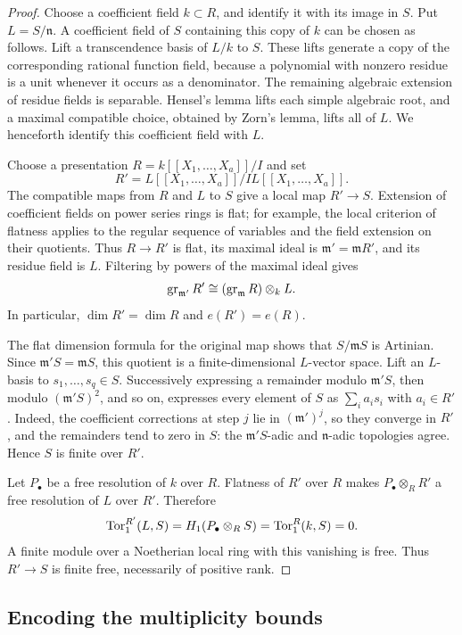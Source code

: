 \begin{proof}
Choose a coefficient field $k\subset R$, and identify it with its image
in $S$.  Put $L=S/\mathfrak n$.  A coefficient field of $S$ containing
this copy of $k$ can be chosen as follows.  Lift a transcendence basis
of $L/k$ to $S$.  These lifts generate a copy of the corresponding
rational function field, because a polynomial with nonzero residue is
a unit whenever it occurs as a denominator.  The remaining algebraic
extension of residue fields is separable.  Hensel's lemma lifts each
simple algebraic root, and a maximal compatible choice, obtained by
Zorn's lemma, lifts all of $L$.  We henceforth identify this coefficient
field with $L$.

Choose a presentation $R=k[[X_1,\ldots,X_a]]/I$ and set
\[
 R'=L[[X_1,\ldots,X_a]]/I L[[X_1,\ldots,X_a]].
\]
The compatible maps from $R$ and $L$ to $S$ give a local map $R'\to S$.
Extension of coefficient fields on power series rings is flat; for
example, the local criterion of flatness applies to the regular
sequence of variables and the field extension on their quotients.
Thus $R\to R'$ is flat, its maximal ideal is $\mathfrak m'=\mathfrak mR'$,
and its residue field is $L$.  Filtering by powers of the maximal
ideal gives
\[
 \operatorname{gr}_{\mathfrak m'}R'
   \cong (\operatorname{gr}_{\mathfrak m}R)\otimes_k L.
\]
In particular, $\dim R'=\dim R$ and $e(R')=e(R)$.

The flat dimension formula for the original map shows that
$S/\mathfrak mS$ is Artinian.  Since
$\mathfrak m'S=\mathfrak mS$, this quotient is a finite-dimensional
$L$-vector space.  Lift an $L$-basis to $s_1,\ldots,s_q\in S$.
Successively expressing a remainder modulo $\mathfrak m'S$, then
modulo $(\mathfrak m'S)^2$, and so on, expresses every element of $S$
as $\sum_i a_i s_i$ with $a_i\in R'$.  Indeed, the coefficient
corrections at step $j$ lie in $(\mathfrak m')^j$, so they converge in
$R'$, and the remainders tend to zero in $S$: the
$\mathfrak m'S$-adic and $\mathfrak n$-adic topologies agree.  Hence
$S$ is finite over $R'$.

Let $P_\bullet$ be a free resolution of $k$ over $R$.  Flatness of
$R'$ over $R$ makes $P_\bullet\otimes_R R'$ a free resolution of $L$
over $R'$.  Therefore
\[
 \operatorname{Tor}^{R'}_1(L,S)
   = H_1(P_\bullet\otimes_R S)
   = \operatorname{Tor}^R_1(k,S)=0.
\]
A finite module over a Noetherian local ring with this vanishing is
free.  Thus $R'\to S$ is finite free, necessarily of positive rank.
\end{proof}

\subsection{Encoding the multiplicity bounds}


